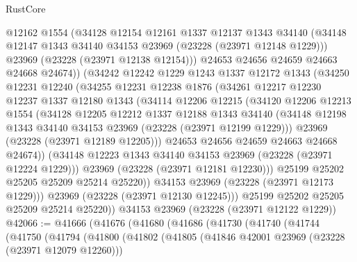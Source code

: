 \begin{lexlean}{RustCore}
\begin{coremodule}
              @12162
              @1554
              (@34128
                @12154
                @12161
                @1337
                @12137
                @1343
                @34140
                (@34148 @12147 @1343 @34140 @34153 @23969 (@23228 (@23971 @12148 @1229)))
                @23969
                (@23228 (@23971 @12138 @12154)))
              @24653
              @24656
              @24659
              @24663
              @24668
              @24674))
          (@34242
            @12242
            @1229
            @1243
            @1337
            @12172
            @1343
            (@34250
              @12231
              @12240
              (@34255
                @12231
                @12238
                @1876
                (@34261
                  @12217
                  @12230
                  @12237
                  @1337
                  @12180
                  @1343
                  (@34114
                    @12206
                    @12215
                    (@34120
                      @12206
                      @12213
                      @1554
                      (@34128
                        @12205
                        @12212
                        @1337
                        @12188
                        @1343
                        @34140
                        (@34148 @12198 @1343 @34140 @34153 @23969 (@23228 (@23971 @12199 @1229)))
                        @23969
                        (@23228 (@23971 @12189 @12205)))
                      @24653
                      @24656
                      @24659
                      @24663
                      @24668
                      @24674))
                  (@34148 @12223 @1343 @34140 @34153 @23969 (@23228 (@23971 @12224 @1229)))
                  @23969
                  (@23228 (@23971 @12181 @12230)))
                @25199
                @25202
                @25205
                @25209
                @25214
                @25220))
            @34153
            @23969
            (@23228 (@23971 @12173 @1229)))
          @23969
          (@23228 (@23971 @12130 @12245)))
        @25199
        @25202
        @25205
        @25209
        @25214
        @25220))
    @34153
    @23969
    (@23228 (@23971 @12122 @1229))
@42066 := @41666
    (@41676
      (@41680
        (@41686
          (@41730
            (@41740
              (@41744
                (@41750
                  (@41794
                    (@41800
                      (@41802
                        (@41805
                          (@41846 @42001 @23969 (@23228 (@23971 @12079 @12260)))

\end{coremodule}
\end{lexlean}

